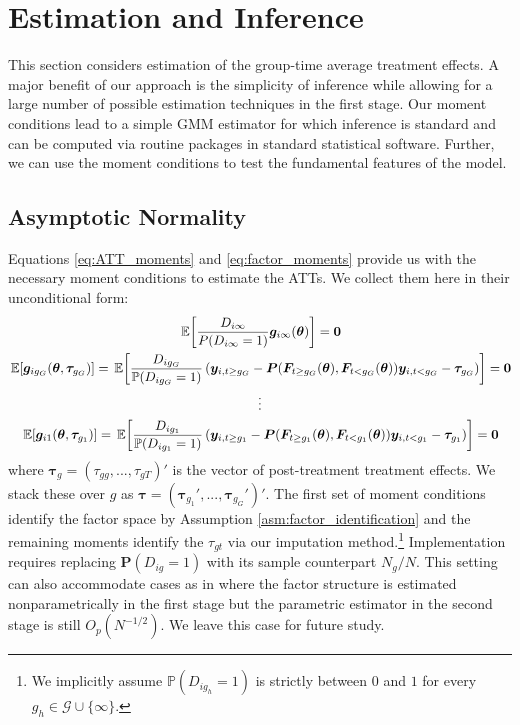 \documentclass[12pt]{article}
\begin{document}
\section{Estimation and Inference}\label{sec:estimation}

This section considers estimation of the group-time average treatment effects. A major benefit of our approach is the simplicity of inference while allowing for a large number of possible estimation techniques in the first stage. Our moment conditions lead to a simple GMM estimator for which inference is standard and can be computed via routine packages in standard statistical software. Further, we can use the moment conditions to test the fundamental features of the model.

\subsection{Asymptotic Normality}

Equations \eqref{eq:ATT_moments} and \eqref{eq:factor_moments} provide us with the necessary moment conditions to estimate the ATTs. We collect them here in their unconditional form: 
\begin{gather*}
  \expec{\frac{D_{i\infty}}{P(D_{i \infty} = 1)}\bm g_{i \infty}(\bm \theta)} = \bm 0\\
  \expec{\bm g_{i g_G}(\bm \theta, \bm \tau_{g_G})} = \expec{ \frac{D_{ig_G}}{\mathbb{P}(D_{ig_G} = 1) } \left( \bm y_{i, t \geq g_G} - \bm P(\bm F_{t \geq g_G}(\bm \theta), \bm F_{t < g_G}(\bm \theta)) \bm y_{i, t < g_G} - \bm \tau_{g_G} \right)} = \bm 0\\
  \vdots\\
  \expec{\bm g_{i 1}(\bm \theta, \bm \tau_{g_1})} = \expec{ \frac{D_{i g_1}}{\mathbb{P}(D_{i g_1} = 1) } \left( \bm y_{i, t \geq g_1} - \bm P(\bm F_{t \geq g_1}(\bm \theta), \bm F_{t < g_1}(\bm \theta)) \bm y_{i, t < g_1} - \bm \tau_{g_1} \right)} = \bm 0
\end{gather*}
where $\bm \tau_g = (\tau_{gg},...,\tau_{gT})'$ is the vector of post-treatment treatment effects. We stack these over $g$ as $\bm \tau = (\bm \tau_{g_1}',...,\bm \tau_{g_G}')'$. The first set of moment conditions identify the factor space by Assumption \ref{asm:factor_identification} and the remaining moments identify the $\tau_{gt}$ via our imputation method.\footnote{We implicitly assume $\mathbb{P}(D_{ig_h} = 1)$ is strictly between $0$ and $1$ for every $g_h \in \mathcal{G} \cup \{\infty\}$.} Implementation requires replacing $\bm P(D_{ig} = 1)$ with its sample counterpart $N_g/N$. This setting can also accommodate cases as in \citet{Hahn_Liao_Geert_2018} where the factor structure is estimated nonparametrically in the first stage but the parametric estimator in the second stage is still $O_p(N^{-1/2})$. We leave this case for future study.
\end{document}
